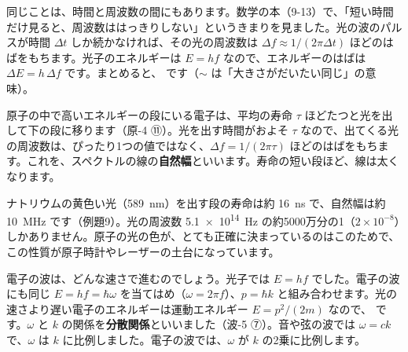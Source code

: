 \label{ph:原-3:sec8}
同じことは、時間と周波数の間にもあります。数学の本（9-13）で、「短い時間だけ見ると、周波数ははっきりしない」というきまりを見ました。光の波のパルスが時間 $\Delta t$ しか続かなければ、その光の周波数は $\Delta f\approx1/(2\pi\Delta t)$ ほどのはばをもちます。光子のエネルギーは $E=hf$ なので、エネルギーのはばは $\Delta E=h\,\Delta f$ です。まとめると、
\label{ph:原-3:et}です（$\sim$ は「大きさがだいたい同じ」の意味）。

\noindent\begin{minipage}[c]{0.5\linewidth}\raggedright
原子の中で高いエネルギーの段にいる電子は、平均の寿命 $\tau$ ほどたつと光を出して下の段に移ります（原-4 ⑪）。光を出す時間がおよそ $\tau$ なので、出てくる光の周波数は、ぴったり1つの値ではなく、$\Delta f=1/(2\pi\tau)$ ほどのはばをもちます。これを、スペクトルの線の\textbf{自然幅}といいます。寿命の短い段ほど、線は太くなります。
\end{minipage}\hfill
\begin{minipage}[c]{0.47\linewidth}\centering
{}
\label{ph:原-3:fig-haba}
\end{minipage}

ナトリウムの黄色い光（\qty{589}{nm}）を出す段の寿命は約 \qty{16}{ns} で、自然幅は約 \qty{10}{MHz} です（例題9）。光の周波数 \qty{5.1e14}{Hz} の約5000万分の1（$2\times10^{-8}$）しかありません。原子の光の色が、とても正確に決まっているのはこのためで、この性質が原子時計やレーザーの土台になっています。

\label{ph:原-3:sec9}
電子の波は、どんな速さで進むのでしょう。光子では $E=hf$ でした。電子の波にも同じ $E=hf=\hbar\omega$ を当てはめ（$\omega=2\pi f$）、$p=\hbar k$ と組み合わせます。光の速さより遅い電子のエネルギーは運動エネルギー $E=p^2/(2m)$ なので、
\label{ph:原-3:bunsan}です。$\omega$ と $k$ の関係を\textbf{分散関係}といいました（波-5 ⑦）。音や弦の波では $\omega=ck$ で、$\omega$ は $k$ に比例しました。電子の波では、$\omega$ が $k$ の2乗に比例します。

